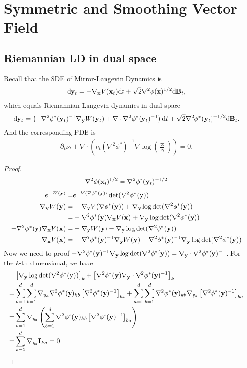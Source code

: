 \section{Symmetric and Smoothing Vector Field}
\subsection{Riemannian LD in dual space}
Recall that the SDE of Mirror-Langevin Dynamics is
\begin{align}
	\mathrm{d} \mathbf{y}_t = -\nabla_{\mathbf{x}} V(\mathbf{x}_t) \mathrm{d} t + \sqrt{2}\nabla^2\phi(\mathbf{x})^{1/2}\mathrm{d} \mathbf{B}_t, 
\end{align}
which equals Riemannian Langevin dynamics in dual space
\begin{align}
	\mathrm{d} \mathbf{y}_t = \left(-\nabla^2\phi^*(\mathbf{y}_t)^{-1}\nabla_{\mathbf{y}} W(\mathbf{y}_t) + \nabla\cdot\nabla^2\phi^*(\mathbf{y}_t)^{-1}\right)\mathrm{d} t + \sqrt{2}\nabla^2\phi^*(\mathbf{y}_t)^{-1/2}\mathrm{d} \mathbf{B}_t.
\end{align}
And the corresponding PDE is 
\begin{align}
	\partial_t \nu_t + \nabla\cdot (\nu_t (\nabla^2\phi^*)^{-1}\nabla\log(\frac{\varpi}{\nu_t})) = 0.
\end{align}
\begin{proof}
\begin{align}
	\nabla^2\phi(\mathbf{x}_t)^{1/2} = \nabla^2\phi^*(\mathbf{y}_t)^{-1/2}
\end{align}
\begin{align*}
	e^{-W(\mathbf{y})} = & e^{-V(\nabla\phi^*(\mathbf{y}))}\det(\nabla^2\phi^*(\mathbf{y})) \\
	-\nabla_{\mathbf{y}} W(\mathbf{y}) = & - \nabla_{\mathbf{y}} V(\nabla\phi^*(\mathbf{y})) + \nabla_{\mathbf{y}} \log\det(\nabla^2\phi^*(\mathbf{y})) \\ 
		= & - \nabla^2\phi^*(\mathbf{y})\nabla_{\mathbf{x}} V(\mathbf{x}) + \nabla_{\mathbf{y}} \log\det(\nabla^2\phi^*(\mathbf{y})) \\ 
	-\nabla^2\phi^*(\mathbf{y})\nabla_{\mathbf{x}} V(\mathbf{x}) = & -\nabla_{\mathbf{y}} W(\mathbf{y}) -  \nabla_{\mathbf{y}} \log\det(\nabla^2\phi^*(\mathbf{y})) \\ 
	-\nabla_{\mathbf{x}} V(\mathbf{x}) = & -\nabla^2\phi^*(\mathbf{y})^{-1} \nabla_{\mathbf{y}} W(\mathbf{y}) - \nabla^2\phi^*(\mathbf{y})^{-1}\nabla_{\mathbf{y}} \log\det(\nabla^2\phi^*(\mathbf{y}))
\end{align*}
Now we need to proof $-\nabla^2\phi^*(\mathbf{y})^{-1}\nabla_{\mathbf{y}} \log\det(\nabla^2\phi^*(\mathbf{y})) = \nabla_{\mathbf{y}}\cdot\nabla^2\phi^*(\mathbf{y})^{-1}$. 
For the $k$-th dimensional, we have 
\begin{align*}
	&\left[\nabla_{\mathbf{y}}\log\det(\nabla^2\phi^*(\mathbf{y}))\right]_k + \left[\nabla^2\phi^*(\mathbf{y})\nabla_{\mathbf{y}}\cdot\nabla^2\phi^*(\mathbf{y})^{-1}\right]_k\\
	= & \sum_{a=1}^d\sum_{b=1}^d \nabla_{y_a}\nabla^2\phi^*(\mathbf{y})_{kb}\left[\nabla^2\phi^*(\mathbf{y})^{-1}\right]_{ba} + \sum_{a=1}^d\sum_{b=1}^d\nabla^2\phi^*(\mathbf{y})_{kb}\nabla_{y_a}\left[\nabla^2\phi^*(\mathbf{y})^{-1}\right]_{ba} \\ 
	= & \sum_{a=1}^d \nabla_{y_a}\left(\sum_{b=1}^d \nabla^2\phi^*(\mathbf{y})_{kb}\left[\nabla^2\phi^*(\mathbf{y})^{-1}\right]_{ba}\right)\\ 
	= & \sum_{a=1}^d\nabla_{y_a}\mathbf{I}_{ka} = 0
\end{align*}

\end{proof}

